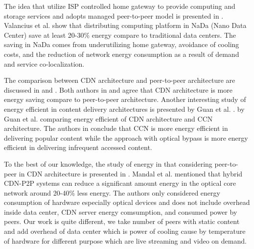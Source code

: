 The idea that utilize ISP controlled home gateway to provide computing and storage services and adopts managed peer-to-peer model is presented in \cite{valancius2009greening}. 
Valancius et al. \cite{valancius2009greening} show that distributing computing platform in NaDa (Nano Data Center) save at least 20-30\% energy compare to traditional data centers.
The saving in NaDa comes from underutilizing home gateway, avoidance of cooling costs, and the reduction of network energy consumption as a result of demand and service co-localization.

The comparison between CDN architecture and peer-to-peer architecture are discussed in \cite{baliga2007energy} and \cite{feldmann2010energy}.
Both authors in \cite{baliga2007energy} and \cite{feldmann2010energy} agree that CDN architecture is more energy saving compare to peer-to-peer architecture. 
Another interesting study of energy efficient in content delivery architectures is presented by Guan et al. \cite{5963557}.
by Guan et al. \cite{5963557} comparing energy efficient of CDN architecture and CCN architecture.
The authors in \cite{5963557} conclude that CCN is more energy efficient in delivering popular content while the approach with optical bypass is more energy efficient in delivering infrequent accessed content.

To the best of our knowledge, the study of energy in that considering peer-to-peer in CDN architecture is presented in \cite{6524219}.
Mandal et al. \cite{6524219} mentioned that hybrid CDN-P2P systems can reduce a significant amount energy in the optical core network around 20-40\% less energy.  
The authors only considered energy consumption of hardware especially optical devices and does not include overhead inside data center, CDN server energy comsumption, and consumed power by peers.
Our work is quite different, we take number of peers with static content and add overhead of data center which is  power of cooling cause by temperature of hardware for different purpose which are live streaming and video on demand.



